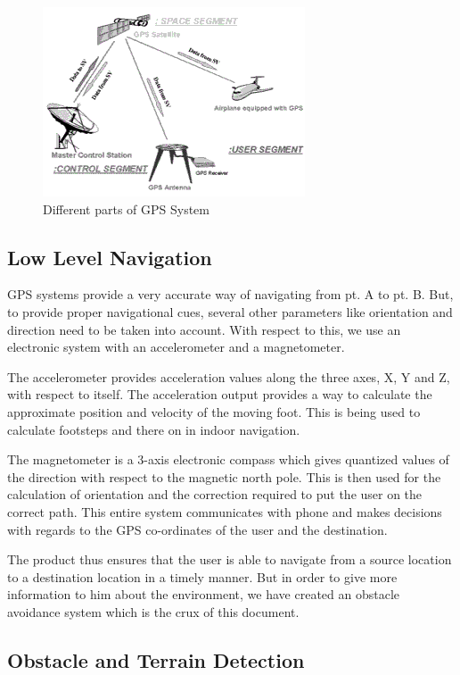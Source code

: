 \documentclass[11pt]{report}
\begin{document}
\begin{figure}[hp]
\centering
\includegraphics[scale=0.5]{fig1.png}
\caption[Different parts of GPS System]{Different parts of GPS System}
\end{figure}

\subsection{Low Level Navigation}

GPS systems provide a very accurate way of navigating from pt. A to pt. B. But, to provide proper navigational cues, several other parameters like orientation and direction need to be taken into account. With respect to this, we use an electronic system with an accelerometer and a magnetometer. 

The accelerometer provides acceleration values along the three axes, X, Y and Z, with respect to itself. The acceleration output provides a way to calculate the approximate position and velocity of the moving foot. This is being used to calculate footsteps and there on in indoor navigation. 

The magnetometer is a 3-axis electronic compass which gives quantized values of the direction with respect to the magnetic north pole. This is then used for the calculation of orientation and the correction required to put the user on the correct path. This entire system communicates with phone and makes decisions with regards to the GPS co-ordinates of the user and the destination. 

The product thus ensures that the user is able to navigate from a source location to a destination location in a timely manner. But in order to give more information to him about the environment, we have created an obstacle avoidance system which is the crux of this document.

\subsection{Obstacle and Terrain Detection}
\end{document}
